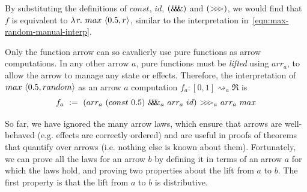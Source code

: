 \documentclass{llncs}
\newcommand{\arrow}{\rightsquigarrow}
\newcommand{\acomp}{\ensuremath{{>}\mspace{-6mu}{>}\mspace{-6mu}{>}}}
\newcommand{\apair}{\ensuremath{\mathit{\&\mspace{-7.5mu}\&\mspace{-7.5mu}\&}}}
\begin{document}
By substituting the definitions of $const$, $id$, $(\apair)$ and $(\acomp)$, we would find that $f$ is equivalent to $\lambda\mspace{2mu}{r}\ldotp\, max~\langle{0.5,r}\rangle$, similar to the interpretation in~\eqref{eqn:max-random-manual-interp}.

Only the function arrow can so cavalierly use pure functions as arrow computations.
In any other arrow $a$, pure functions must be \emph{lifted} using $arr_a$, to allow the arrow to manage any state or effects.
Therefore, the interpretation of $max~\langle{0.5,random}\rangle$ as an arrow $a$ computation $f_a : [0,1] \arrow_a \Re$ is
\begin{equation}
	f_a\ :=\ (arr_a~(const~0.5)~\apair_a~arr_a~id)~\acomp_a~arr_a~max
\end{equation}

So far, we have ignored the many arrow laws, which ensure that arrows are well-behaved (e.g. effects are correctly ordered) and are useful in proofs of theorems that quantify over arrows (i.e. nothing else is known about them).
Fortunately, we can prove all the laws for an arrow $b$ by defining it in terms of an arrow $a$ for which the laws hold, and proving two properties about the lift from $a$ to $b$.
The first property is that the lift from $a$ to $b$ is distributive.
\end{document}
